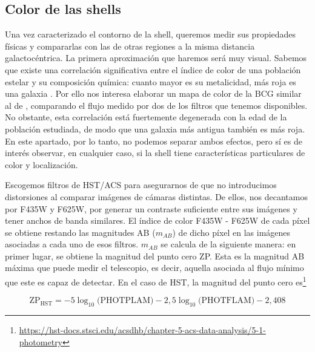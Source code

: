 \subsection{Color de las shells} \label{sec:colorshells}
Una vez caracterizado el contorno de la shell, queremos medir sus propiedades físicas y compararlas con las de otras regiones a la misma distancia galactocéntrica. La primera aproximación que haremos será muy visual. Sabemos que existe una correlación significativa entre el índice de color de una población estelar y su composición química: cuanto mayor es su metalicidad, más roja es una galaxia \citep{bruzualStellarPopulationSynthesis2003,mihosStelLARPOPULATIONSOUTER2013,montesINTRACLUSTERLIGHTFRONTIER2014}. Por ello nos interesa elaborar un mapa de color de la BCG similar al de \citet[fig. 1]{mihosStelLARPOPULATIONSOUTER2013}, comparando el flujo medido por dos de los filtros que tenemos disponibles. No obstante, esta correlación está fuertemente degenerada con la edad de la población estudiada, de modo que una galaxia más antigua también es más roja. En este apartado, por lo tanto, no podemos separar ambos efectos, pero sí es de interés observar, en cualquier caso, si la shell tiene características particulares de color y localización. \par


Escogemos filtros de HST/ACS para asegurarnos de que no introducimos distorsiones al comparar imágenes de cámaras distintas. De ellos, nos decantamos por F435W y F625W, por generar un contraste suficiente entre sus imágenes y tener anchos de banda similares. El índice de color F435W - F625W de cada píxel se obtiene restando las magnitudes AB (\(m_{AB}\)) de dicho píxel en las imágenes asociadas a cada uno de esos filtros. \(m_{AB}\) se calcula de la siguiente manera: en primer lugar, se obtiene la magnitud del punto cero ZP. Esta es la magnitud AB máxima que puede medir el telescopio, es decir, aquella asociada al flujo mínimo que este es capaz de detectar. En el caso de HST, la magnitud del punto cero es\footnote{\url{https://hst-docs.stsci.edu/acsdhb/chapter-5-acs-data-analysis/5-1-photometry}} 

\begin{equation}
    \text{ZP}_{\text{HST}} = -5\log_{10}{\text{(PHOTPLAM)}} - 2,5\log_{10}{\text{(PHOTFLAM)}} - 2,408 
\end{equation}

